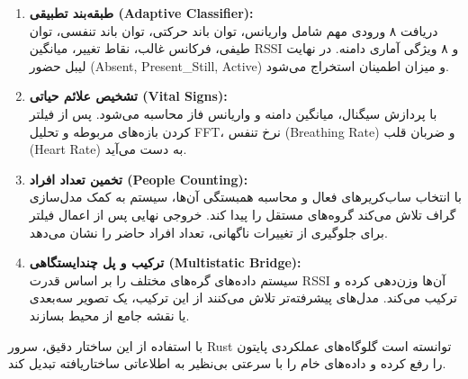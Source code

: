 \documentclass[12pt, a4paper]{article}
\newcommand{\lr}[1]{\foreignlanguage{english}{#1}}
\begin{document}
\begin{enumerate}
    \item \textbf{طبقه‌بند تطبیقی (\lr{Adaptive Classifier}):} \\
    دریافت ۸ ورودی مهم شامل واریانس، توان باند حرکتی، توان باند تنفسی، توان طیفی، فرکانس غالب، نقاط تغییر، میانگین \lr{RSSI} و ۸ ویژگی آماری دامنه. در نهایت لیبل حضور (\lr{Absent, Present\_Still, Active}) و میزان اطمینان استخراج می‌شود.
    
    \item \textbf{تشخیص علائم حیاتی (\lr{Vital Signs}):} \\
    با پردازش سیگنال، میانگین دامنه و واریانس فاز محاسبه می‌شود. پس از فیلتر کردن بازه‌های مربوطه و تحلیل \lr{FFT}، نرخ تنفس (\lr{Breathing Rate}) و ضربان قلب (\lr{Heart Rate}) به دست می‌آید.
    
    \item \textbf{تخمین تعداد افراد (\lr{People Counting}):} \\
    با انتخاب ساب‌کریرهای فعال و محاسبه همبستگی آن‌ها، سیستم به کمک مدل‌سازی گراف تلاش می‌کند گروه‌های مستقل را پیدا کند. خروجی نهایی پس از اعمال فیلتر برای جلوگیری از تغییرات ناگهانی، تعداد افراد حاضر را نشان می‌دهد.
    
    \item \textbf{ترکیب و پل چندایستگاهی (\lr{Multistatic Bridge}):} \\
    سیستم داده‌های گره‌های مختلف را بر اساس قدرت \lr{RSSI} آن‌ها وزن‌دهی کرده و ترکیب می‌کند. مدل‌های پیشرفته‌تر تلاش می‌کنند از این ترکیب، یک تصویر سه‌بعدی یا نقشه جامع از محیط بسازند.
\end{enumerate}

با استفاده از این ساختار دقیق، سرور \lr{Rust} توانسته است گلوگاه‌های عملکردی پایتون را رفع کرده و داده‌های خام را با سرعتی بی‌نظیر به اطلاعاتی ساختاریافته تبدیل کند.
\end{document}

